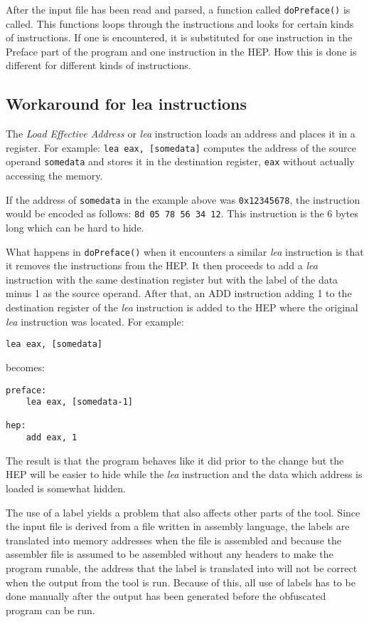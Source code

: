 \documentclass[11pt,twoside]{eitExjobb}
\begin{document}
After the input file has been read and parsed, a function called \texttt{doPreface()} is called. This functions loops through the instructions and looks for certain kinds of instructions. If one is encountered, it is substituted for one instruction in the Preface part of the program and one instruction in the HEP. How this is done is different for different kinds of instructions.  

\subsection{Workaround for lea instructions}
The \emph{Load Effective Address} or \emph{lea} instruction loads an address and places it in a register. For example: \texttt{lea eax, [somedata]} computes the address of the source operand \texttt{somedata} and stores it in the destination register, \texttt{eax} without actually accessing the memory. 

If the address of \texttt{somedata} in the example above was \texttt{0x12345678}, the instruction would be encoded as follows: \texttt{8d 05 78 56 34 12}. This instruction is the 6 bytes long which can be hard to hide. 

What happens in \texttt{doPreface()} when it encounters a similar \emph{lea} instruction is that it removes the instructions from the HEP. It then proceeds to add a \emph{lea} instruction with the same destination register but with the label of the data minus 1 as the source operand. After that, an ADD instruction adding 1 to the destination register of the \emph{lea} instruction is added to the HEP where the original \emph{lea} instruction was located. For example:

\begin{verbatim}
lea eax, [somedata]
\end{verbatim}

\noindent becomes:

\begin{verbatim}
preface:
	lea eax, [somedata-1]

hep:
	add eax, 1
\end{verbatim}

\noindent The result is that the program behaves like it did prior to the change but the HEP will be easier to hide while the \emph{lea} instruction and the data which address is loaded is somewhat hidden.

The use of a label yields a problem that also affects other parts of the tool. Since the input file is derived from a file written in assembly language, the labels are translated into memory addresses when the file is assembled and because the assembler file is assumed to be assembled without any headers to make the program runable, the address that the label is translated into will not be correct when the output from the tool is run. Because of this, all use of labels has to be done manually after the output has been generated before the obfuscated program can be run.
\end{document}
